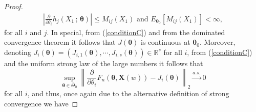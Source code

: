 \documentclass[12pt]{article} %
\newcommand{\R}{\mathbb{R}}
\newcommand{\bs}{\boldsymbol}
\theoremstyle{definition}
\begin{document}
\begin{proof}
\begin{equation}
\begin{aligned}
 \left|\frac{\partial}{\partial \theta_i}h_j(X_1\, ;\, \bs{\theta})\right|\leq M_{ij}(X_1)\mbox{ and }E_{\bs{\theta}_0}\left[M_{ij}(X_1)\right]<\infty,
 \end{aligned}
 \end{equation}
for all $i$ and $j$. In special, from (\ref{conditionC}) and from the dominated convergence theorem it follows that $J(\bs{\theta})$ is continuous at $\bs{\theta}_0$. Moreover, denoting $J_i(\bs{\theta})=\left(J_{i,1}(\bs{\theta}),\cdots,J_{i,s}(\bs{\theta})\right)\in \R^s$ for all $i$, from (\ref{conditionC}) and the uniform strong law of the large numbers it follows that
\begin{equation*}\sup_{\bs{\theta}\in \overline{\Theta}_0}\left\|\frac{\partial }{\partial \theta_i}F_n(\bs{\theta},\bs{X}(w)) - J_i(\bs{\theta})\right\|_2 \overset{a.s.}{\to} 0
\end{equation*}
for all $i$, and thus, once again due to the alternative definition of strong convergence we have


\end{proof}
\end{document}
